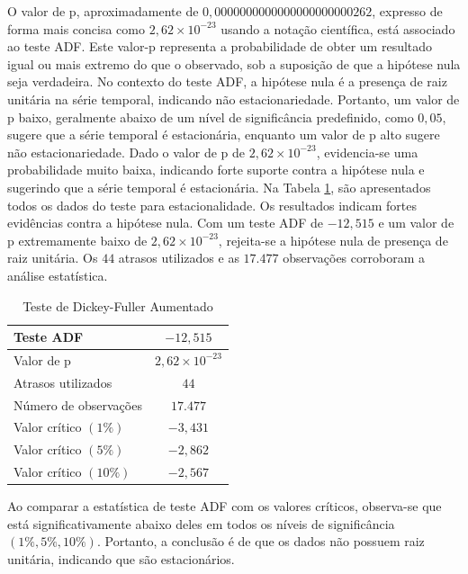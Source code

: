 O valor de p, aproximadamente de $0,0000000000000000000000262$, expresso de forma mais concisa como $2,62\times 10^{-23}$ usando a notação científica, está associado ao teste ADF. Este valor-p representa a probabilidade de obter um resultado igual ou mais extremo do que o observado, sob a suposição de que a hipótese nula seja verdadeira. No contexto do teste ADF, a hipótese nula é a presença de raiz unitária na série temporal, indicando não estacionariedade. Portanto, um valor de p baixo, geralmente abaixo de um nível de significância predefinido, como $0,05$, sugere que a série temporal é estacionária, enquanto um valor de p alto sugere não estacionariedade. Dado o valor de p de $2,62\times 10^{-23}$, evidencia-se uma probabilidade muito baixa, indicando forte suporte contra a hipótese nula e sugerindo que a série temporal é estacionária. Na Tabela \ref{tb:adf}, são apresentados todos os dados do teste para estacionalidade.
Os resultados indicam fortes evidências contra a hipótese nula. Com um teste ADF de $-12,515 $ e um valor de p extremamente baixo de $2,62 \times 10^{-23}$, rejeita-se a hipótese nula de presença de raiz unitária. Os $44$ atrasos utilizados e as $17.477$ observações corroboram a análise estatística.

\begin{table}[!htb]
	\centering
	\caption{Teste de Dickey-Fuller Aumentado}\label{tb:adf}
	\begin{tabular}{lc}
		\hline
		Teste ADF & $-12,515$ \\ \hline
		Valor de p & $2,62 \times 10^{-23}$ \\
		Atrasos utilizados & $44$ \\
		Número de observações & $17.477$ \\
		Valor crítico $(1\%)$ & $-3,431$ \\
		Valor crítico $(5\%)$ & $-2,862$ \\
		Valor crítico $(10\%)$ & $-2,567$ \\
		\hline
	\end{tabular}
\end{table}




Ao comparar a estatística de teste ADF com os valores críticos, observa-se que está significativamente abaixo deles em todos os níveis de significância $(1\%, 5\%, 10\%)$. Portanto, a conclusão é de que os dados não possuem raiz unitária, indicando que são estacionários.

